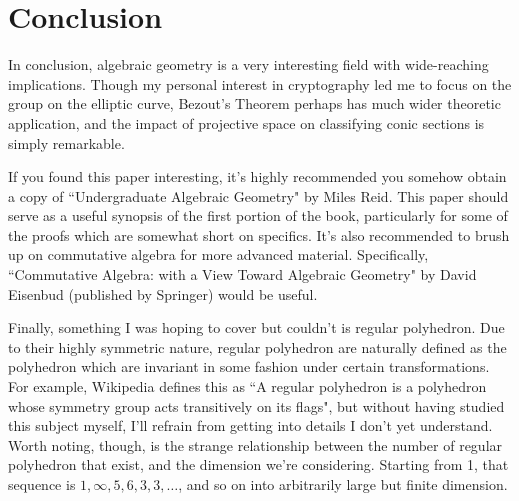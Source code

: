 \section{Conclusion}

In conclusion, algebraic geometry is a very interesting
field with wide-reaching implications. Though my personal interest
in cryptography led me to focus on the group on
the elliptic curve, Bezout's Theorem perhaps has much wider
theoretic application, and the impact of projective space
on classifying conic sections is simply remarkable.

If you found this paper interesting, it's highly
recommended you somehow obtain a copy of 
``Undergraduate Algebraic Geometry" by Miles Reid. This 
paper should serve as a useful synopsis of the first portion
of the book, particularly for some of the proofs which
are somewhat short on specifics. It's also recommended
to brush up on commutative algebra for more advanced material.
Specifically,
``Commutative Algebra: with a View Toward Algebraic Geometry"
by David Eisenbud (published by Springer) would be useful.

Finally, something I was hoping to cover but couldn't is
regular polyhedron. Due to their highly symmetric nature,
regular polyhedron are naturally defined as the polyhedron
which are invariant in some fashion under certain transformations.
For example, Wikipedia defines this as ``A regular polyhedron is a polyhedron
whose symmetry group acts transitively on its flags", but without
having studied this subject myself, I'll refrain from
getting into details I don't yet understand. Worth noting,
though, is the strange relationship between the number of
regular polyhedron that exist, and the dimension we're considering.
Starting from 1, that sequence is $1,\infty,5,6,3,3,\dots$, and 
so on into arbitrarily large but finite dimension.

